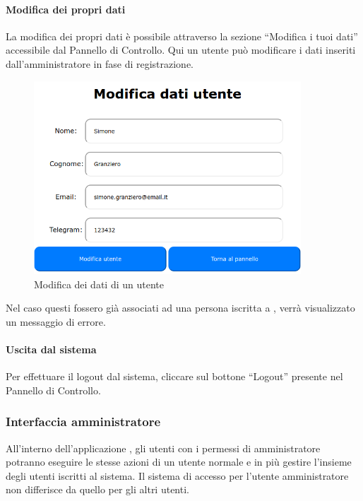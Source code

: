 \paragraph{Modifica dei propri dati}
La modifica dei propri dati è possibile attraverso la sezione ``Modifica i tuoi dati'' accessibile dal Pannello di Controllo.
Qui un utente può modificare i dati inseriti dall'amministratore in fase di registrazione.
\begin{figure}[H]
	\centering
	\includegraphics[width=10cm]{img/modifica_1.png}
	\caption{Modifica dei dati di un utente}
\end{figure}
Nel caso questi fossero già associati ad una persona iscritta a \progetto, verrà visualizzato un messaggio di errore.

\paragraph{Uscita dal sistema}
Per effettuare il logout dal sistema, cliccare sul bottone ``Logout'' presente nel Pannello di Controllo.

\subsubsection{Interfaccia amministratore}
All'interno dell'applicazione \progetto, gli utenti con i permessi di amministratore potranno eseguire le stesse azioni di un utente normale e in più gestire l'insieme degli utenti iscritti al sistema. Il sistema di accesso per l'utente amministratore non differisce da quello per gli altri utenti.

